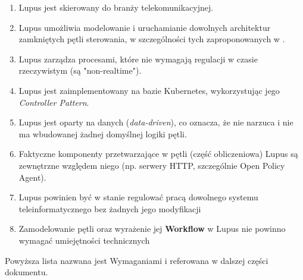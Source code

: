 \begin{enumerate}
    \item \label{req:1} Lupus jest skierowany do branży telekomunikacyjnej.
    \item \label{req:2} Lupus umożliwia modelowanie i uruchamianie dowolnych architektur zamkniętych pętli sterowania, w szczególności tych zaproponowanych w \cite{enioverview}.
    \item \label{req:3} Lupus zarządza procesami, które nie wymagają regulacji w czasie rzeczywistym (są "non-realtime").
    \item \label{req:4} Lupus jest zaimplementowany na bazie Kubernetes, wykorzystując jego \textit{Controller Pattern}.
    \item \label{req:5} Lupus jest oparty na danych (\textit{data-driven}), co oznacza, że nie narzuca i nie ma wbudowanej żadnej domyślnej logiki pętli.
    \item \label{req:6} Faktyczne komponenty przetwarzające w pętli (część obliczeniowa) Lupus są zewnętrzne względem niego (np. serwery HTTP, szczególnie Open Policy Agent).
    \item \label{reg:7} Lupus powinien być w stanie regulować pracą dowolnego systemu teleinformatycznego bez żadnych jego modyfikacji
    \item \label{reg:8} Zamodelowanie pętli oraz wyrażenie jej \textbf{Workflow} w Lupus nie powinno wymagać umiejętności technicznych
\end{enumerate}

Powyższa lista nazwana jest Wymaganiami i referowana w dalszej części dokumentu. 
